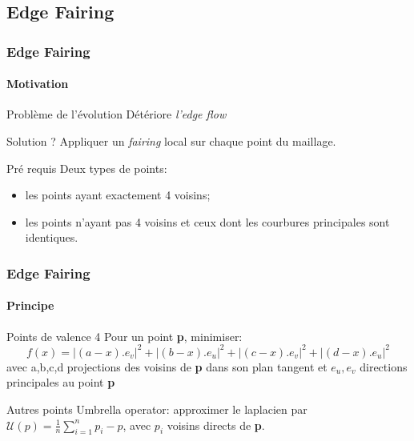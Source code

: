 \documentclass[9pt]{beamer}
\begin{document}
\subsection{Edge Fairing}

\begin{frame}
	\frametitle{Edge Fairing}
	\framesubtitle{Motivation}
	
	\begin{block}{Problème de l'évolution}
		Détériore \textit{l'edge flow}
	\end{block}
	
	\begin{block}{Solution ?}
		Appliquer un \textit{fairing} local sur chaque point du maillage.
	\end{block}
	
	\begin{block}{Pré requis}
		Deux types de points:
		\begin{itemize}
			\item les points ayant exactement 4 voisins;
			\item les points n'ayant pas 4 voisins et ceux dont les courbures principales sont identiques.
		\end{itemize}
	\end{block}
\end{frame}

\begin{frame}
	\frametitle{Edge Fairing}
	\framesubtitle{Principe}
	
	\begin{block}{Points de valence 4}
		Pour un point \textbf{p}, minimiser:
		\begin{equation*}
			f(x) = |(a-x).e_v|^2 + |(b-x).e_u|^2 + |(c-x).e_v|^2 + |(d-x).e_u|^2
		\end{equation*}
		avec a,b,c,d projections des voisins de \textbf{p} dans son plan tangent et $e_u, e_v$ directions principales au point 				\textbf{p}
	\end{block}
	
	\begin{block}{Autres points}
		Umbrella operator: approximer le laplacien par $\mathcal{U}(p) = \displaystyle \frac{1}{n} \sum \limits_{i=1}^{n} p_i - p$, avec $p_i$ voisins directs de \textbf{p}.
	\end{block}
\end{frame}


\end{document}
